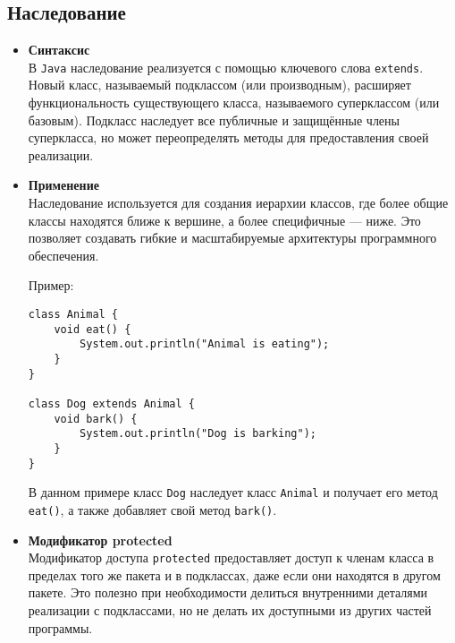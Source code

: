 \subsection{Наследование}
\begin{itemize}
    \item \textbf{Синтаксис} \\
    В \texttt{Java} наследование реализуется с помощью ключевого слова \texttt{extends}. Новый класс, называемый подклассом (или производным), расширяет функциональность существующего класса, называемого суперклассом (или базовым). Подкласс наследует все публичные и защищённые члены суперкласса, но может переопределять методы для предоставления своей реализации.


    \item \textbf{Применение} \\
    Наследование используется для создания иерархии классов, где более общие классы находятся ближе к вершине, а более специфичные — ниже. Это позволяет создавать гибкие и масштабируемые архитектуры программного обеспечения.

    Пример:
    \begin{verbatim}
class Animal {
    void eat() {
        System.out.println("Animal is eating");
    }
}

class Dog extends Animal {
    void bark() {
        System.out.println("Dog is barking");
    }
}
    \end{verbatim}
    В данном примере класс \texttt{Dog} наследует класс \texttt{Animal} и получает его метод \texttt{eat()}, а также добавляет свой метод \texttt{bark()}.


    \item \textbf{Модификатор protected} \\
    Модификатор доступа \texttt{protected} предоставляет доступ к членам класса в пределах того же пакета и в подклассах, даже если они находятся в другом пакете. Это полезно при необходимости делиться внутренними деталями реализации с подклассами, но не делать их доступными из других частей программы.
\end{itemize}

